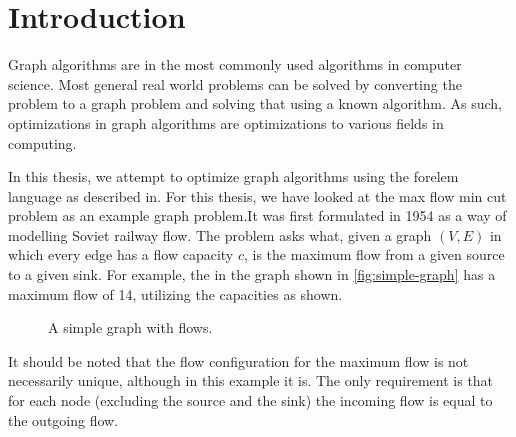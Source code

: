 \chapter{Introduction}

Graph algorithms are in the most commonly used algorithms in computer science. Most general real world problems can be solved by converting the problem to a graph problem and solving that using a known algorithm. As such, optimizations in graph algorithms are optimizations to various fields in computing.

In this thesis, we attempt to optimize graph algorithms using the forelem language as described in\cite{AVersatileTupleBasedOptimizationFramework}. For this thesis, we have looked at the max flow min cut problem as an example graph problem.It was first formulated in 1954 as a way of modelling Soviet railway flow\cite{HarrisRoss}. The problem asks what, given a graph $(V,E)$ in which every edge has a flow capacity $c$, is the maximum flow from a given source to a given sink. For example, the in the graph shown in \autoref{fig:simple-graph} has a maximum flow of 14, utilizing the capacities as shown.

\begin{figure}[h]
\centering
{}
\caption{A simple graph with flows.}
\label{fig:simple-graph}
\end{figure}

It should be noted that the flow configuration for the maximum flow is not necessarily unique, although in this example it is. The only requirement is that for each node (excluding the source and the sink) the incoming flow is equal to the outgoing flow.

